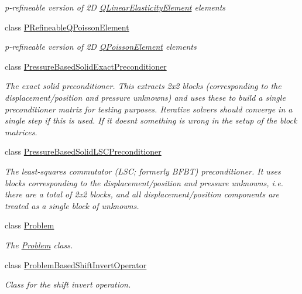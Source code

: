 \begin{DoxyCompactItemize}
\begin{DoxyCompactList}\small\item\em p-\/refineable version of 2D \hyperlink{classoomph_1_1QLinearElasticityElement}{Q\+Linear\+Elasticity\+Element} elements \end{DoxyCompactList}\item 
class \hyperlink{classoomph_1_1PRefineableQPoissonElement}{P\+Refineable\+Q\+Poisson\+Element}
\begin{DoxyCompactList}\small\item\em p-\/refineable version of 2D \hyperlink{classoomph_1_1QPoissonElement}{Q\+Poisson\+Element} elements \end{DoxyCompactList}\item 
class \hyperlink{classoomph_1_1PressureBasedSolidExactPreconditioner}{Pressure\+Based\+Solid\+Exact\+Preconditioner}
\begin{DoxyCompactList}\small\item\em The exact solid preconditioner. This extracts 2x2 blocks (corresponding to the displacement/position and pressure unknowns) and uses these to build a single preconditioner matrix for testing purposes. Iterative solvers should converge in a single step if this is used. If it doesn\textquotesingle{}t something is wrong in the setup of the block matrices. \end{DoxyCompactList}\item 
class \hyperlink{classoomph_1_1PressureBasedSolidLSCPreconditioner}{Pressure\+Based\+Solid\+L\+S\+C\+Preconditioner}
\begin{DoxyCompactList}\small\item\em The least-\/squares commutator (L\+SC; formerly B\+F\+BT) preconditioner. It uses blocks corresponding to the displacement/position and pressure unknowns, i.\+e. there are a total of 2x2 blocks, and all displacement/position components are treated as a single block of unknowns. \end{DoxyCompactList}\item 
class \hyperlink{classoomph_1_1Problem}{Problem}
\begin{DoxyCompactList}\small\item\em The \hyperlink{classoomph_1_1Problem}{Problem} class. \end{DoxyCompactList}\item 
class \hyperlink{classoomph_1_1ProblemBasedShiftInvertOperator}{Problem\+Based\+Shift\+Invert\+Operator}
\begin{DoxyCompactList}\small\item\em Class for the shift invert operation. \end{DoxyCompactList}\item 

\end{DoxyCompactItemize}
